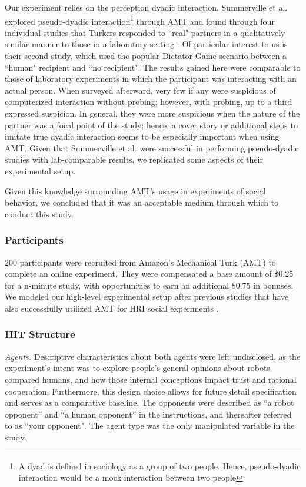 \documentclass{sig-alternate}
\begin{document}
Our experiment relies on the perception dyadic interaction. Summerville et al. explored pseudo-dyadic interaction\footnote{A dyad is defined in sociology as a group of two people. Hence, pseudo-dyadic interaction would be a mock interaction between two people} through AMT and found through four individual studies that Turkers responded to ``real" partners in a qualitatively similar manner to those in a laboratory setting \cite{summerville2013pseudo}. Of particular interest to us is their second study, which used the popular Dictator Game scenario between a ``human" recipient and ``no recipient". The results gained here were comparable to those of laboratory experiments in which the participant was interacting with an actual person. When surveyed afterward, very few if any were suspicious of computerized interaction without probing; however, with probing, up to a third expressed suspicion. In general, they were more suspicious when the nature of the partner was a focal point of the study; hence, a cover story or additional steps to imitate true dyadic interaction seems to be especially important when using AMT. Given that Summerville et al. were successful in performing pseudo-dyadic studies with lab-comparable results, we replicated some aspects of their experimental setup.

Given this knowledge surrounding AMT's usage in experiments of social behavior, we concluded that it was an acceptable medium through which to conduct this study.

\subsubsection{Participants}
200 participants were recruited from Amazon's Mechanical Turk (AMT) to complete an online experiment. They were compensated a base amount of \$0.25 for a n-minute study, with opportunities to earn an additional \$0.75 in bonuses. We modeled our high-level experimental setup after previous studies that have also successfully utilized AMT for HRI social experiments \cite{malle2015sacrifice} \cite{summerville2013pseudo}.

\subsubsection{HIT Structure}
\textit{Agents. } Descriptive characteristics about both agents were left undisclosed, as the experiment's intent was to explore people's general opinions about robots compared humans, and how those internal conceptions impact trust and rational cooperation. Furthermore, this design choice allows for future detail specification and serves as a comparative baseline. The opponents were described as ``a robot opponent'' and ``a human opponent'' in the instructions, and thereafter referred to as ``your opponent". The agent type was the only manipulated variable in the study.
\end{document}
